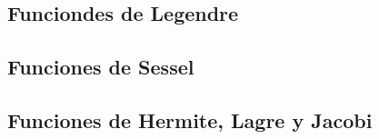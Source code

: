 \documentclass{article}
\begin{document}
\subsection*{Funciondes de Legendre}
\subsection*{Funciones de Sessel}
\subsection*{Funciones de Hermite, Lagre y Jacobi}
\end{document}
